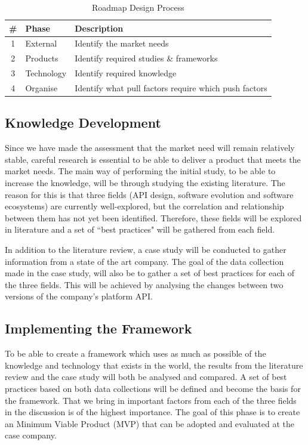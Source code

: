 \documentclass{article}
\begin{document}
\begin{table}[ht]
\centering
\begin{tabular}[ht]{|c|l|l|}
\hline
\textbf{\#} & \textbf{Phase} & \textbf{Description} \\
\hline
1 & External & Identify the market needs \\
\hline
2 & Products & Identify required studies \& frameworks \\
\hline
3 & Technology & Identify required knowledge \\
\hline
4 & Organise & Identify what pull factors require which push factors \\
\hline
\end{tabular}
\caption{Roadmap Design Process}
\label{tab:proc}
\end{table}

\subsection{Knowledge Development}
Since we have made the assessment that the market need will remain relatively stable, careful research is essential to be able to deliver a product that meets the market needs. The main way of performing the initial study, to be able to increase the knowledge, will be through studying the existing literature. The reason for this is that three fields (API design, software evolution and software ecosystems) are currently well-explored, but the correlation and relationship between them has not yet been identified. Therefore, these fields will be explored in literature and a set of ``best practices" will be gathered from each field. 

In addition to the literature review, a case study will be conducted to gather information from a state of the art company. The goal of the data collection made in the case study, will also be to gather a set of best practices for each of the three fields. This will be achieved by analysing the changes between two versions of the company's platform API. 


\subsection{Implementing the Framework}
To be able to create a framework which uses as much as possible of the knowledge and technology that exists in the world, the results from the literature review and the case study will both be analysed and compared. A set of best practices based on both data collections will be defined and become the basis for the framework. That we bring in important factors from each of the three fields in the discussion is of the highest importance. The goal of this phase is to create an Minimum Viable Product (MVP) that can be adopted and evaluated at the case company. 
\end{document}
